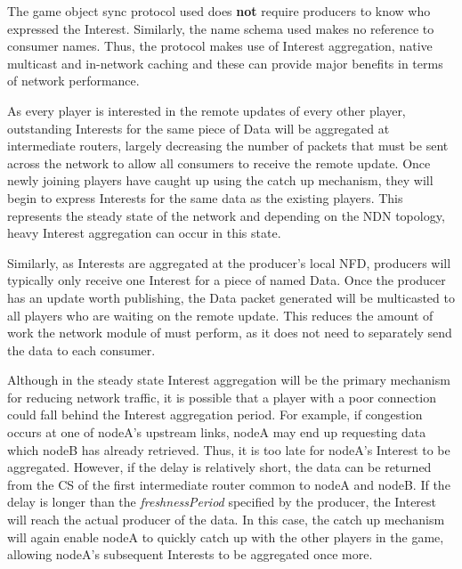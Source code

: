 The game object sync protocol used does \textbf{not} require producers to know who expressed the Interest. Similarly, the name schema used makes no reference to consumer names. Thus, the protocol makes use of Interest aggregation, native multicast and in-network caching and these can provide major benefits in terms of network performance.

As every player is interested in the remote updates of every other player, outstanding Interests for the same piece of Data will be aggregated at intermediate routers, largely decreasing the number of packets that must be sent across the network to allow all consumers to receive the remote update. Once newly joining players have caught up using the catch up mechanism, they will begin to express Interests for the same data as the existing players. This represents the steady state of the network and depending on the NDN topology, heavy Interest aggregation can occur in this state.

Similarly, as Interests are aggregated at the producer's local NFD, producers will typically only receive one Interest for a piece of named Data. Once the producer has an update worth publishing, the Data packet generated will be multicasted to all players who are waiting on the remote update. This reduces the amount of work the network module of \game{} must perform, as it does not need to separately send the data to each consumer.

Although in the steady state Interest aggregation will be the primary mechanism for reducing network traffic, it is possible that a player with a poor connection could fall behind the Interest aggregation period. For example, if congestion occurs at one of nodeA's upstream links, nodeA may end up requesting data which nodeB has already retrieved. Thus, it is too late for nodeA's Interest to be aggregated. However, if the delay is relatively short, the data can be returned from the CS of the first intermediate router common to nodeA and nodeB. If the delay is longer than the \textit{freshnessPeriod} specified by the producer, the Interest will reach the actual producer of the data. In this case, the catch up mechanism will again enable nodeA to quickly catch up with the other players in the game, allowing nodeA's subsequent Interests to be aggregated once more.






